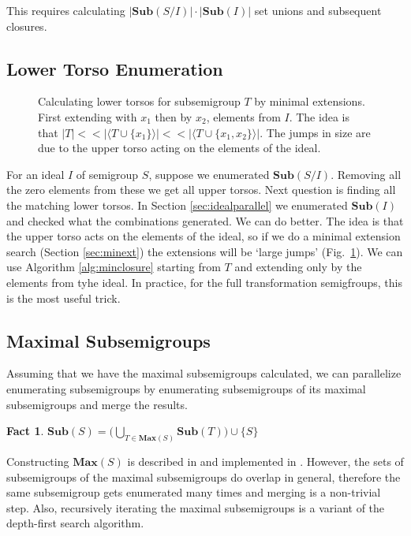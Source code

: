 \documentclass{amsart}
\newcommand{\Sub}{\mathbf{Sub}}
\newcommand{\Max}{\mathbf{Max}}
\theoremstyle{plain}
\newtheorem{fact}[theorem]{Fact}
\theoremstyle{definition}
\begin{document}
This requires calculating $|\Sub(S/I)|\cdot|\Sub(I)|$ set unions and subsequent closures. 
\subsection{Lower Torso Enumeration}
\label{sec:lowertorso}
\begin{figure}

\caption{Calculating lower torsos for subsemigroup $T$ by minimal extensions. First extending with $x_1$ then by $x_2$, elements from $I$. The idea is that $|T| << |\langle T\cup\{x_1\}\rangle| << |\langle T\cup\{x_1,x_2\}\rangle|$. The jumps in size are due to the upper torso acting on the elements of the ideal.}
\label{fig:lowertorsoenum}
\end{figure}
For an ideal $I$ of semigroup $S$, suppose we enumerated $\Sub(S/I)$.
Removing all the zero elements from these we get all upper torsos.
Next question is finding all the matching lower torsos.
In Section \ref{sec:idealparallel} we enumerated $\Sub(I)$ and checked what the combinations generated.
We can do better.
The idea is that the upper torso acts on the elements of the ideal, so if we do a minimal extension search (Section \ref{sec:minext}) the extensions will be `large jumps' (Fig.~\ref{fig:lowertorsoenum}).
We can use Algorithm \ref{alg:minclosure} starting from $T$ and extending only by the elements from tyhe ideal. %
In practice, for the full transformation semigfroups, this is the most useful trick.

\subsection{Maximal Subsemigroups}
Assuming that we have the maximal subsemigroups calculated, we can parallelize enumerating subsemigroups by enumerating subsemigroups of its maximal subsemigroups and merge the results.
\begin{fact}
$\Sub(S)=\big( \bigcup_{T\in \Max(S)}\Sub(T)\big)\cup \{S\}$
\end{fact}
\noindent Constructing $\Max(S)$ is described in \cite{MaxSubSemi} and implemented in \cite{Semigroups}.
However, the sets of subsemigroups of the maximal subsemigroups do overlap in general, therefore the same subsemigroup gets enumerated many times and merging is a non-trivial step.
Also, recursively iterating the maximal subsemigroups is a variant of the depth-first search algorithm.  
\end{document}
